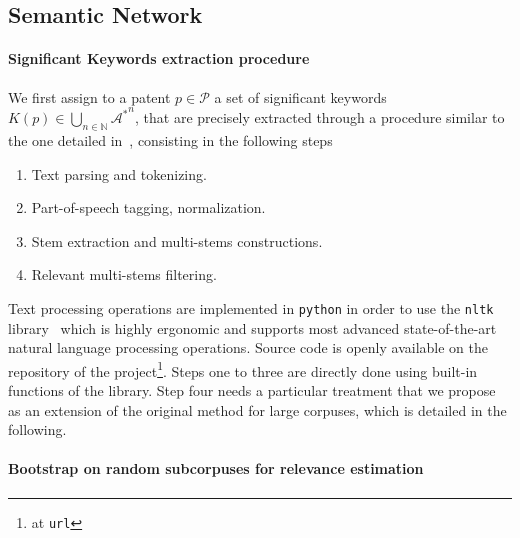 \subsection{Semantic Network}

\paragraph{Significant Keywords extraction procedure}

We first assign to a patent $p \in \mathcal{P}$ a set of significant keywords $K(p)\in \bigcup_{n\in \mathbb{N}} {\mathcal{A}^{\ast}}^n$, that are precisely extracted through a procedure similar to the one detailed in~\cite{chavalarias2013phylomemetic}, consisting in the following steps
\begin{enumerate}
\item Text parsing and tokenizing.
\item Part-of-speech tagging, normalization.
\item Stem extraction and multi-stems constructions.
\item Relevant multi-stems filtering.
\end{enumerate}

Text processing operations are implemented in \texttt{python} in order to use the \texttt{nltk} library~\cite{} %
which is highly ergonomic and supports most advanced state-of-the-art natural language processing operations. Source code is openly available on the repository of the project\footnote{at \texttt{url}}.
Steps one to three are directly done using built-in functions of the library. Step four needs a particular treatment that we propose as an extension of the original method for large corpuses, which is detailed in the following.

\paragraph{Bootstrap on random subcorpuses for relevance estimation}

